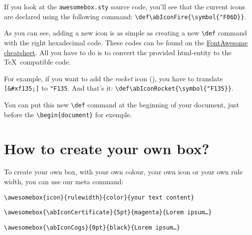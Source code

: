 \documentclass[a4paper,12pt]{article}
\def\abIconRocket{\symbol{"F135}}
\newcommand\hrefcolor[2]{\textcolor{magenta}{\href{#1}{#2}}}
\begin{document}
If you look at the \texttt{awesomebox.sty} source code, you'll see that
the current icons are declared using the following command:
\verb!\def\abIconFire{\symbol{"F06D}}!.

As you can see, adding a new icon is as simple as creating a new
\verb!\def! command with the right hexadecimal code. These codes can be
found on the \hrefcolor{http://fontawesome.io/cheatsheet/}{FontAwesome
  cheatsheet}. All you have to do is to convert the provided html-entity
to the \TeX\ compatible code.

For example, if you want to add the \emph{rocket} icon
({\ABFamily\abIconRocket}), you have to translate \verb![&#xf135;]! to
\texttt{"F135}. And that's it:
\verb!\def\abIconRocket{\symbol{"F135}}!.

You can put this new \verb!\def! command at the beginning of your
document, just before the \verb!\begin{document}! for exemple.

\section{How to create your own box?}

To create your own box, with your own colour, your own icon or your own
rule width, you can use our meta command:

\begin{center}
\verb!\awesomebox{icon}{rulewidth}{color}{your text content}!
\end{center}

\clearpage

\begin{center}
\verb!\awesomebox{\abIconCertificate}{5pt}{magenta}{Lorem ipsum…}!
\end{center}


\begin{center}
\verb!\awesomebox{\abIconCogs}{0pt}{black}{Lorem ipsum…}!
\end{center}

\end{document}
